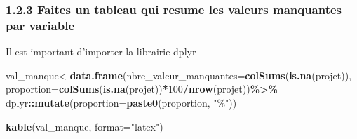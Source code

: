 \documentclass[
]{article}
\newenvironment{Shaded}{\begin{snugshade}}{\end{snugshade}}
\newcommand{\AttributeTok}[1]{\textcolor[rgb]{0.13,0.29,0.53}{#1}}
\newcommand{\DecValTok}[1]{\textcolor[rgb]{0.00,0.00,0.81}{#1}}
\newcommand{\FunctionTok}[1]{\textcolor[rgb]{0.13,0.29,0.53}{\textbf{#1}}}
\newcommand{\NormalTok}[1]{#1}
\newcommand{\OtherTok}[1]{\textcolor[rgb]{0.56,0.35,0.01}{#1}}
\newcommand{\SpecialCharTok}[1]{\textcolor[rgb]{0.81,0.36,0.00}{\textbf{#1}}}
\newcommand{\StringTok}[1]{\textcolor[rgb]{0.31,0.60,0.02}{#1}}
\begin{document}
\hypertarget{faites-un-tableau-qui-resume-les-valeurs-manquantes-par-variable}{%
\subsubsection{1.2.3 Faites un tableau qui resume les valeurs manquantes
par
variable}\label{faites-un-tableau-qui-resume-les-valeurs-manquantes-par-variable}}

Il est important d'importer la librairie dplyr

\begin{Shaded}
\begin{Highlighting}[]
\NormalTok{val\_manque}\OtherTok{\textless{}{-}}\FunctionTok{data.frame}\NormalTok{(}\AttributeTok{nbre\_valeur\_manquantes=}\FunctionTok{colSums}\NormalTok{(}\FunctionTok{is.na}\NormalTok{(projet)),}
                  \AttributeTok{proportion=}\FunctionTok{colSums}\NormalTok{(}\FunctionTok{is.na}\NormalTok{(projet))}\SpecialCharTok{*}\DecValTok{100}\SpecialCharTok{/}\FunctionTok{nrow}\NormalTok{(projet))}\SpecialCharTok{\%\textgreater{}\%}  
\NormalTok{                 dplyr}\SpecialCharTok{::}\FunctionTok{mutate}\NormalTok{(}\AttributeTok{proportion=}\FunctionTok{paste0}\NormalTok{(proportion, }\StringTok{"\%"}\NormalTok{))}

\FunctionTok{kable}\NormalTok{(val\_manque, }\AttributeTok{format=}\StringTok{"latex"}\NormalTok{)}
\end{Highlighting}
\end{Shaded}
\end{document}
